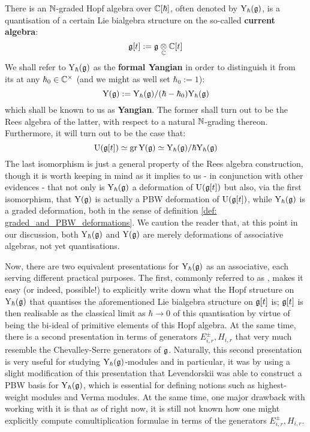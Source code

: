         There is an $\mathbb{N}$-graded Hopf algebra over $\mathbb{C}[\hbar]$, often denoted by $\mathrm{Y}_{\hbar}(\mathfrak{g})$, is a quantisation of a certain Lie bialgebra structure on the so-called \textbf{current algebra}:
            $$\g[t] := \g \tensor_{\bbC} \bbC[t]$$
        We shall refer to $\mathrm{Y}_{\hbar}(\mathfrak{g})$ as the \textbf{formal Yangian} in order to distinguish it from its  at any $\hbar_0 \in \bbC^{\x}$ (and we might as well set $\hbar_0 := 1$):
            $$\mathrm{Y}(\mathfrak{g}) := \mathrm{Y}_{\hbar}(\mathfrak{g})/(\hbar - \hbar_0)\mathrm{Y}_{\hbar}(\mathfrak{g})$$
        which shall be known to us as  \textbf{Yangian}. The former shall turn out to be the Rees algebra of the latter, with respect to a natural $\mathbb{N}$-grading thereon. Furthermore, it will turn out to be the case that:
            $$\mathrm{U}( \mathfrak{g}[t] ) \simeq \operatorname{gr} \mathrm{Y}(\mathfrak{g}) \simeq \mathrm{Y}_{\hbar}(\mathfrak{g})/\hbar\mathrm{Y}_{\hbar}(\mathfrak{g})$$
        The last isomorphism is just a general property of the Rees algebra construction, though it is worth keeping in mind as it implies to us - in conjunction with other evidences - that not only is $\mathrm{Y}_{\hbar}(\mathfrak{g})$ a deformation of $\mathrm{U}( \mathfrak{g}[t] )$ but also, via the first isomorphism, that $\mathrm{Y}(\mathfrak{g})$ is actually a PBW deformation of $\mathrm{U}( \mathfrak{g}[t] )$, while $\mathrm{Y}_{\hbar}(\mathfrak{g})$ is a graded deformation, both in the sense of definition \ref{def: graded_and_PBW_deformations}. We caution the reader that, at this point in our discussion, both $\mathrm{Y}_{\hbar}(\mathfrak{g})$ and $\mathrm{Y}(\mathfrak{g})$ are merely deformations of associative algebras, not yet quantisations. 

        Now, there are two equivalent presentations for $\mathrm{Y}_{\hbar}(\mathfrak{g})$ as an associative, each serving different practical purposes. The first, commonly referred to as , makes it easy (or indeed, possible!) to explicitly write down what the Hopf structure on $\mathrm{Y}_{\hbar}(\mathfrak{g})$ that quantises the aforementioned Lie bialgebra structure on $\mathfrak{g}[t]$ is; $\mathfrak{g}[t]$ is then realisable as the classical limit as $\hbar \to 0$ of this quantisation by virtue of being the bi-ideal of primitive elements of this Hopf algebra. At the same time, there is a second presentation in terms of generators $E_{i, r}^{\pm}, H_{i, r}$ that very much resemble the Chevalley-Serre generators of $\mathfrak{g}$. Naturally, this second presentation is very useful for studying $\mathrm{Y}_{\hbar}(\mathfrak{g})$-modules and in particular, it was by using a slight modification of this presentation that Levendorskii was able to construct a PBW basis for $\mathrm{Y}_{\hbar}(\mathfrak{g})$, which is essential for defining notions such as highest-weight modules and Verma modules. At the same time, one major drawback with working with it is that as of right now, it is still not known how one might explicitly compute comultiplication formulae in terms of the generators $E_{i, r}^{\pm}, H_{i, r}$. 

